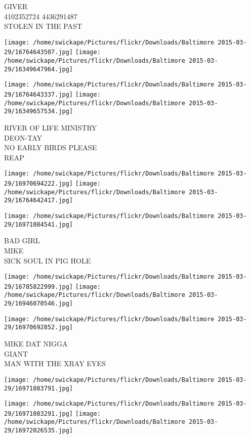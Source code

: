 \documentclass[10pt,letterpaper]{article}
\begin{document}
GIVER\\
4102352724 4436291487\\
STOLEN IN THE PAST
\pagebreak

\texttt{[image: /home/swickape/Pictures/flickr/Downloads/Baltimore 2015-03-29/16764643507.jpg]}
\texttt{[image: /home/swickape/Pictures/flickr/Downloads/Baltimore 2015-03-29/16349647964.jpg]}

\texttt{[image: /home/swickape/Pictures/flickr/Downloads/Baltimore 2015-03-29/16764643337.jpg]}
\texttt{[image: /home/swickape/Pictures/flickr/Downloads/Baltimore 2015-03-29/16349657534.jpg]}

RIVER OF LIFE MINISTRY\\
DEON{-}TAY\\
NO EARLY BIRDS PLEASE\\
REAP
\pagebreak

\texttt{[image: /home/swickape/Pictures/flickr/Downloads/Baltimore 2015-03-29/16970694222.jpg]}
\texttt{[image: /home/swickape/Pictures/flickr/Downloads/Baltimore 2015-03-29/16764642417.jpg]}

\vspace{0.25in}
\texttt{[image: /home/swickape/Pictures/flickr/Downloads/Baltimore 2015-03-29/16971084541.jpg]}

BAD GIRL\\
MIKE\\
SICK SOUL IN PIG HOLE
\pagebreak

\texttt{[image: /home/swickape/Pictures/flickr/Downloads/Baltimore 2015-03-29/16785822999.jpg]}
\texttt{[image: /home/swickape/Pictures/flickr/Downloads/Baltimore 2015-03-29/16946070546.jpg]}

\vspace{0.25in}
\texttt{[image: /home/swickape/Pictures/flickr/Downloads/Baltimore 2015-03-29/16970692852.jpg]}

MIKE DAT NIGGA\\
GIANT\\
MAN WITH THE XRAY EYES
\pagebreak

\texttt{[image: /home/swickape/Pictures/flickr/Downloads/Baltimore 2015-03-29/16971083791.jpg]}

\vspace{0.25in}
\texttt{[image: /home/swickape/Pictures/flickr/Downloads/Baltimore 2015-03-29/16971083291.jpg]}
\texttt{[image: /home/swickape/Pictures/flickr/Downloads/Baltimore 2015-03-29/16972026535.jpg]}
\end{document}
